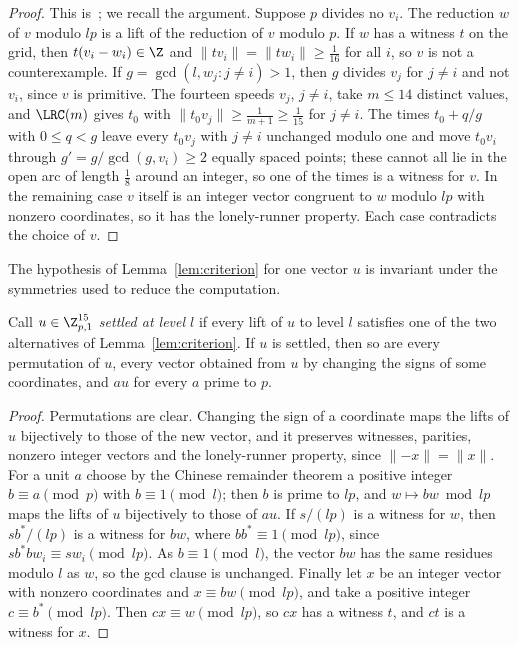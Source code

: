 \begin{proof}
This is~\cite[Lemma~2.2]{All26}; we recall the argument. Suppose $p$ divides
no $v_i$. The reduction $w$ of $v$ modulo $lp$ is a lift of the reduction of
$v$ modulo $p$. If $w$ has a witness $t$ on the grid, then $t(v_i-w_i)\in\Z$
and $\|tv_i\|=\|tw_i\|\ge\frac1{16}$ for all $i$, so $v$ is not a
counterexample. If $g=\gcd(l,w_j:j\ne i)>1$, then $g$ divides $v_j$ for
$j\ne i$ and not $v_i$, since $v$ is primitive. The fourteen speeds $v_j$,
$j\ne i$, take $m\le 14$ distinct values, and $\LRC(m)$ gives $t_0$ with
$\|t_0v_j\|\ge\frac1{m+1}\ge\frac1{15}$ for $j\ne i$. The times
$t_0+q/g$ with $0\le q<g$ leave every $t_0v_j$ with $j\ne i$ unchanged
modulo one and move $t_0v_i$ through $g'=g/\gcd(g,v_i)\ge2$ equally spaced
points; these cannot all lie in the open arc of length $\frac18$ around an
integer, so one of the times is a witness for $v$. In the remaining case $v$
itself is an integer vector congruent to $w$ modulo $lp$ with nonzero
coordinates, so it has the lonely-runner property. Each case contradicts
the choice of $v$.
\end{proof}

The hypothesis of Lemma~\ref{lem:criterion} for one vector $u$ is invariant
under the symmetries used to reduce the computation.

\begin{lemma}[Symmetries]\label{lem:symm}
Call $u\in\Z_{p,1}^{15}$ \emph{settled at level $l$} if every lift of $u$ to
level $l$ satisfies one of the two alternatives of
Lemma~\ref{lem:criterion}. If $u$ is settled, then so are every permutation
of $u$, every vector obtained from $u$ by changing the signs of some
coordinates, and $au$ for every $a$ prime to $p$.
\end{lemma}

\begin{proof}
Permutations are clear. Changing the sign of a coordinate maps the lifts of
$u$ bijectively to those of the new vector, and it preserves witnesses,
parities, nonzero integer vectors and the lonely-runner property, since
$\|{-x}\|=\|x\|$. For a unit $a$ choose by the Chinese remainder theorem a
positive integer $b\equiv a\pmod p$ with $b\equiv1\pmod l$; then $b$ is
prime to $lp$, and $w\mapsto bw\bmod lp$ maps the lifts of $u$ bijectively
to those of $au$. If $s/(lp)$ is a witness for $w$, then $sb^*/(lp)$ is a
witness for $bw$, where $bb^*\equiv1\pmod{lp}$, since
$sb^*bw_i\equiv sw_i\pmod{lp}$. As $b\equiv1\pmod l$, the vector $bw$ has
the same residues modulo $l$ as $w$, so the gcd clause is unchanged. Finally
let $x$ be an integer vector with nonzero coordinates and $x\equiv bw\pmod
{lp}$, and take a positive integer $c\equiv b^*\pmod{lp}$. Then
$cx\equiv w\pmod{lp}$, so $cx$ has a witness $t$, and $ct$ is a witness for
$x$.
\end{proof}


